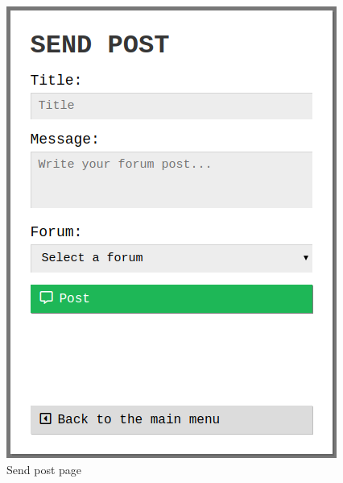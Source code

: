\begin{table}[H]
\begin{minipage}{.33\textwidth}
\begin{figure}[H]
            \includegraphics[width=0.95\linewidth]{InteraktionsDesign/Assets/Prototype/4.png}
            \caption{Send post page}
            \label{fig:prototype4}
        \end{figure}
    \end{minipage}
    \begin{minipage}{.33\textwidth}
        \begin{figure}[H]
            \centering

\end{figure}
\end{minipage}
\end{table}
